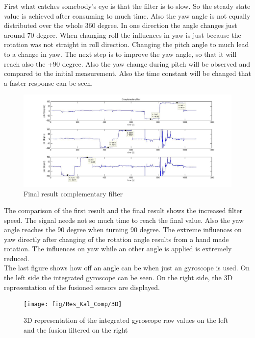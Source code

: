 First what catches somebody's eye is that the filter is to slow. So the steady state value is achieved after consuming to much time. Also the yaw angle is not equally distributed over the whole 360 degree. In one direction the angle changes just around 70 degree. When changing roll the influences in yaw is just because the rotation was not straight in roll direction. Changing the pitch angle to much lead to a change in yaw. The next step is to improve the yaw angle, so that it will reach also the +90 degree. Also the yaw change during pitch will be observed and compared to the initial measurement. Also the time constant will be changed that a faster response can be seen.
\begin{figure}[H]
	\centering\includegraphics[width=1.0\textwidth]{fig/Res_Kal_Comp/final_Comp1}
	\caption{Final result complementary filter}
	\label{fig:final_Comp}
\end{figure}
The comparison of the first result and the final result shows the increased filter speed. The signal needs not so much time to reach the final value. Also the yaw angle reaches the 90 degree when turning 90 degree. The extreme influences on yaw directly after changing of the rotation angle results from a hand made rotation. The influences on yaw while an other angle is applied is extremely reduced.\\

The last figure shows how off an angle can be when just an gyroscope is used. On the left side the integrated gyroscope can be seen. On the right side, the 3D representation of the fusioned sensors are displayed.
\begin{figure}[H]
	\centering\texttt{[image: fig/Res\_Kal\_Comp/3D]}
	\caption[3D representation of Complementary-filtered IMU-Data in MATLAB]{3D representation of the integrated gyroscope raw values on the left and the fusion filtered on the right}
	\label{fig:3D}
\end{figure}


